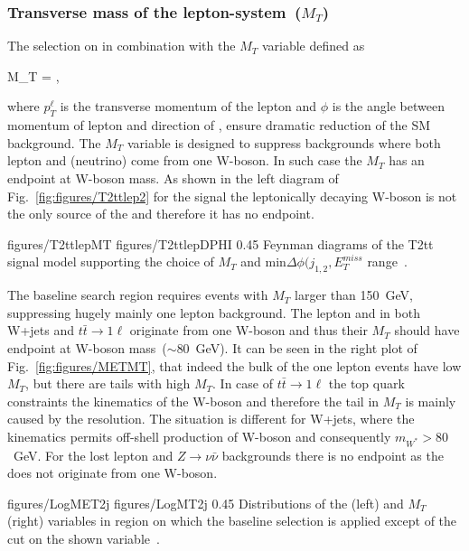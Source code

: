 \subsubsection{Transverse mass of the lepton-\MET system~($M_{T}$)}

The selection on \MET in combination with the $M_{T}$ variable defined as

{
 M_{T} =  ,
}

where $p_{T}^{\ell}$ is the transverse momentum of the lepton and $\phi$ is the angle between momentum of lepton and direction of \MET, ensure dramatic reduction of the SM background. The $M_{T}$ variable is  designed to suppress backgrounds where both lepton and \MET (neutrino) come from one W-boson. In such case the $M_{T}$ has an endpoint at W-boson mass. As shown in the left diagram of Fig.~\ref{fig:figures/T2ttlep2} for the signal the leptonically decaying W-boson is not the only source of the \MET and therefore it has no endpoint.

                 {figures/T2ttlepMT} %
                 {figures/T2ttlepDPHI} %
                 {0.45}       %
                 { Feynman diagrams of the T2tt signal model supporting the choice of $M_{T}$ and min$\Delta \phi (j_{1,2}, E_{T}^{miss}$ range~\cite{CMS:2016vew}. }

The baseline search region requires events with $M_{T}$ larger than 150~GeV, suppressing hugely mainly one lepton background. The lepton and \MET in both  W+jets and $t \bar{t} \to 1\ell$ originate from one W-boson and thus their $M_{T}$ should have endpoint at W-boson mass~($\sim$80~GeV). It can be seen in the right plot of Fig.~\ref{fig:figures/METMT}, that indeed the bulk of the one lepton events have low $M_{T}$, but there are tails with high $M_{T}$. In case of $t \bar{t} \to 1\ell$ the top quark constraints the kinematics of the W-boson and therefore the tail in $M_{T}$  is mainly caused by the \MET resolution. The situation is different for W+jets, where the kinematics permits off-shell production of W-boson and consequently $m_{W^{*}}> 80$~GeV. For the lost lepton and $Z \to \nu \bar{\nu}$ backgrounds there is no endpoint as the \MET does not originate from one W-boson.

                 {figures/LogMET2j} %
                 {figures/LogMT2j} %
                 {0.45}       %
                 { Distributions of the \MET (left) and $M_{T}$ (right) variables in region on which the baseline selection is applied except of the cut on the shown variable~\cite{website:stopSupp}. }


